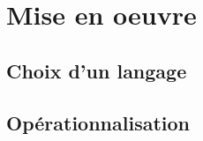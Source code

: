 \chapter{Mise en oeuvre}\label{chap:op}
\minitoc
\section{Choix d'un langage}\label{sec:ln}
\section{Opérationnalisation}\label{sec:op}
